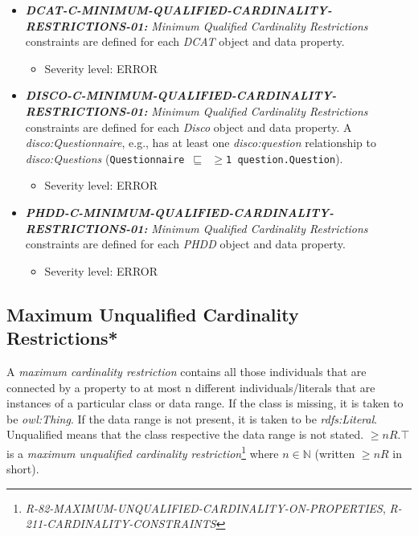 \documentclass{llncs}
\newcommand{\ms}[1]{\texttt{#1}}
\begin{document}
\begin{itemize}
	\item \textbf{{\em DCAT-C-MINIMUM-QUALIFIED-CARDINALITY-RESTRICTIONS-01:}}
	{\em Minimum Qualified Cardinality Restrictions} constraints are defined for each \emph{DCAT} object and data property.
	\begin{itemize}
		\item Severity level: ERROR
	\end{itemize}
\end{itemize}

\begin{itemize}
	\item \textbf{{\em DISCO-C-MINIMUM-QUALIFIED-CARDINALITY-RESTRICTIONS-01:}}
	{\em Minimum Qualified Cardinality Restrictions} constraints are defined for each \emph{Disco} object and data property.
  A {\em disco:Questionnaire}, e.g., has at least one {\em disco:question} relationship to {\em disco:Questions} (\ms{Questionnaire $\sqsubseteq$ $\geq$1 question.Question}).
	\begin{itemize}
		\item Severity level: ERROR
	\end{itemize}
\end{itemize}

\begin{itemize}
	\item \textbf{{\em PHDD-C-MINIMUM-QUALIFIED-CARDINALITY-RESTRICTIONS-01:}}
	{\em Minimum Qualified Cardinality Restrictions} constraints are defined for each \emph{PHDD} object and data property.
	\begin{itemize}
		\item Severity level: ERROR
	\end{itemize}
\end{itemize}

\subsection{Maximum Unqualified Cardinality Restrictions*}

A \emph{maximum cardinality restriction} contains all those individuals that are connected by a property to at most n different individuals/literals that are instances of a particular class or data range. If the class is missing, it is taken to be \emph{owl:Thing}. If the data range is not present, it is taken to be \emph{rdfs:Literal}.
Unqualified means that the class respective the data range is not stated. 
$\geq n R. \top$ is a \emph{maximum unqualified cardinality restriction}\footnote{\emph{R-82-MAXIMUM-UNQUALIFIED-CARDINALITY-ON-PROPERTIES}, \emph{R-211-CARDINALITY-CONSTRAINTS}} where $n \in \mathbb{N}$ (written $\geq  n R$ in short).
\end{document}
